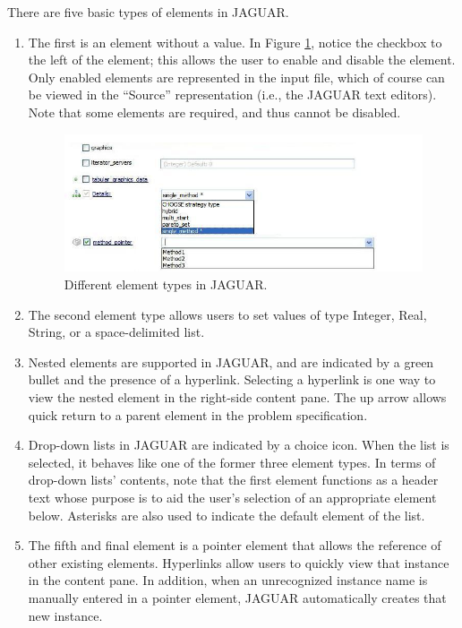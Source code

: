 There are five basic types of elements in JAGUAR.
\begin{enumerate}
\item The first is an element without a value.  In Figure
  \ref{fig:input:jag_graphical5}, notice the checkbox to the left of
  the element; this allows the user to enable and disable the element.
  Only enabled elements are represented in the input file, which of
  course can be viewed in the ``Source'' representation (i.e., the
  JAGUAR text editors).  Note that some elements are required, and
  thus cannot be disabled.
\begin{figure}
  \centering
  \includegraphics[scale=0.8]{images/jag_graphical5}
  \caption{Different element types in JAGUAR.}
  \label{fig:input:jag_graphical5}
\end{figure}

\item The second element type allows users to set values of type
  Integer, Real, String, or a space-delimited list.

\item Nested elements are supported in JAGUAR, and are indicated by a
  green bullet and the presence of a hyperlink.  Selecting a hyperlink
  is one way to view the nested element in the right-side content
  pane.  The up arrow allows quick return to a parent element in the
  problem specification.

\item Drop-down lists in JAGUAR are indicated by a choice icon.  When
  the list is selected, it behaves like one of the former three
  element types.  In terms of drop-down lists' contents, note that the
  first element functions as a header text whose purpose is to aid the
  user's selection of an appropriate element below.  Asterisks are
  also used to indicate the default element of the list.

\item The fifth and final element is a pointer element that allows the
  reference of other existing elements.  Hyperlinks allow users to
  quickly view that instance in the content pane.  In addition, when
  an unrecognized instance name is manually entered in a pointer
  element, JAGUAR automatically creates that new instance.

\end{enumerate}

